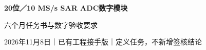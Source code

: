 \documentclass[zihao=5,a4paper,fontset=none]{ctexart}
\begin{document}
\begin{center}
{\LARGE\sffamily\bfseries 20位／10 MS/s SAR ADC数字模块}\par\vspace{3pt}
{\large\sffamily 六个月任务书与数字验收要求}\par\vspace{3pt}
{\small 2026年11月8日｜已有工程接手版｜定义任务，不新增签核结论}
\end{center}
\end{document}
